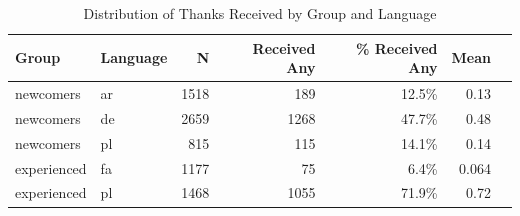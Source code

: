\begin{table}[h]
\centering
\caption{Distribution of Thanks Received by Group and Language}
\begin{tabular}{llrrrrl}
\toprule
Group & Language & N & Received Any & \% Received Any & Mean \\
\midrule
newcomers & ar & 1518 & 189 & 12.5\% & 0.13 \\
newcomers & de & 2659 & 1268 & 47.7\% & 0.48 \\
newcomers & pl & 815 & 115 & 14.1\% & 0.14 \\
\midrule
experienced & fa & 1177 & 75 & 6.4\% & 0.064 \\
experienced & pl & 1468 & 1055 & 71.9\% & 0.72 \\
\bottomrule
\end{tabular}
\label{tab:thanks-distribution}
\end{table}